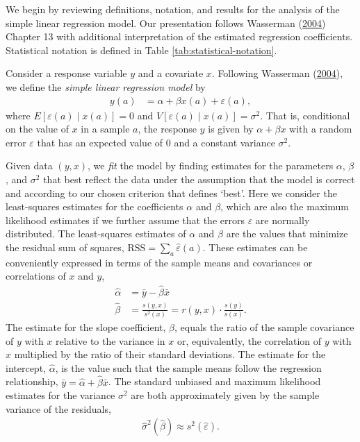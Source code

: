 \documentclass[
]{article}
\begin{document}
We begin by reviewing definitions, notation, and results for the analysis of the simple linear regression model.
Our presentation follows Wasserman (\protect\hyperlink{ref-wasserman2004allo}{2004}) Chapter 13 with additional interpretation of the estimated regression coefficients.
Statistical notation is defined in Table \ref{tab:statistical-notation}.

Consider a response variable \(y\) and a covariate \(x\).
Following Wasserman (\protect\hyperlink{ref-wasserman2004allo}{2004}), we define the \emph{simple linear regression model} by
\begin{align}
  \label{eq:lm}
  y(a) &= \alpha + \beta x(a) + \varepsilon(a),
\end{align}
where \(E[\varepsilon(a) \mid x(a)] = 0\) and \(V[\varepsilon(a) \mid x(a)] = \sigma^2\).
That is, conditional on the value of \(x\) in a sample \(a\), the response \(y\) is given by \(\alpha + \beta x\) with a random error \(\varepsilon\) that has an expected value of \(0\) and a constant variance \(\sigma^2\).

Given data \((y, x)\), we \emph{fit} the model by finding estimates for the parameters \(\alpha\), \(\beta\), and \(\sigma^2\) that best reflect the data under the assumption that the model is correct and according to our chosen criterion that defines `best'.
Here we consider the least-squares estimates for the coefficients \(\alpha\) and \(\beta\), which are also the maximum likelihood estimates if we further assume that the errors \(\varepsilon\) are normally distributed.
The least-squares estimates of \(\alpha\) and \(\beta\) are the values that minimize the residual sum of squares, \(\text{RSS} = \sum_{a} \hat \varepsilon(a)\).
These estimates can be conveniently expressed in terms of the sample means and covariances or correlations of \(x\) and \(y\),
\begin{align}
  \label{eq:lm-hat}
  \hat \alpha &= \bar y - \hat \beta \bar x \\
  \hat \beta &= \frac{s(y,x)}{s^2(x)} = r(y,x) \cdot \frac{s(y)}{s(x)}.
\end{align}
The estimate for the slope coefficient, \(\hat \beta\), equals the ratio of the sample covariance of \(y\) with \(x\) relative to the variance in \(x\) or, equivalently, the correlation of \(y\) with \(x\) multiplied by the ratio of their standard deviations.
The estimate for the intercept, \(\hat \alpha\), is the value such that the sample means follow the regression relationship, \(\bar y = \hat \alpha + \hat \beta \bar x\).
The standard unbiased and maximum likelihood estimates for the variance \(\sigma^{2}\) are both approximately given by the sample variance of the residuals,
\begin{align}
  \label{eq:lm-var}
  \hat{\sigma}^2(\hat \beta) \approx s^2(\hat \varepsilon).
\end{align}
\end{document}
